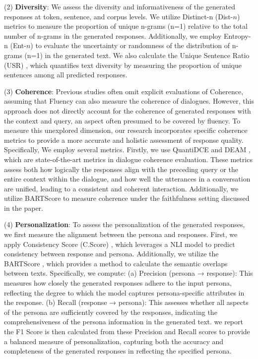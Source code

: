 \documentclass[letterpaper]{article} %
\begin{document}
(2) \textbf{Diversity}: We assess the diversity and informativeness of the generated responses at token, sentence, and corpus levels. We utilize Distinct-n (Dist-$n$) metrics \cite{li-etal-2016-diversity} to measure the proportion of unique n-grams (n=1) relative to the total number of n-grams in the generated responses. Additionally, we employ Entropy-n (Ent-$n$) \cite{zhang-etal-2018-generating} to evaluate the uncertainty or randomness of the distribution of n-grams (n=1) in the generated text. We also calculate the Unique Sentence Ratio (USR) \cite{li-etal-2020-generate}, which quantifies text diversity by measuring the proportion of unique sentences among all predicted responses.

(3) \textbf{Coherence}: Previous studies often omit explicit evaluations of Coherence, assuming that Fluency can also measure the coherence of dialogues. However, this approach does not directly account for the coherence of generated responses with the context and query, an aspect often presumed to be covered by fluency. To measure this unexplored dimension, our research incorporates specific coherence metrics to provide a more accurate and holistic assessment of response quality. Specifically, We employ several metrics. Firstly, we use QuantiDCE \cite{ye-etal-2021-towards-quantifiable} and DEAM \cite{ghazarian-etal-2022-deam}, which are state-of-the-art metrics in dialogue coherence evaluation. These metrics assess both how logically the responses align with the preceding query or the entire context within the dialogue, and how well the utterances in a conversation are unified, leading to a consistent and coherent interaction. Additionally, we utilize BARTScore \cite{yuan-etal-2021-bartscore} to measure coherence under the faithfulness setting discussed in the paper.

(4) \textbf{Personalization}: To assess the personalization of the generated responses, we first measure the alignment between the persona and responses. First, we apply Consistency Score (C.Score) \cite{madotto-etal-2019-personalizing}, which leverages a NLI model to predict consistency between response and persona. Additionally, we utilize the BARTScore \cite{yuan-etal-2021-bartscore}, which provides a method to calculate the semantic overlaps between texts. Specifically, we compute: (a) Precision (persona → response): This measures how closely the generated responses adhere to the input persona, reflecting the degree to which the model captures persona-specific attributes in the response. (b) Recall (response → persona): This assesses whether all aspects of the persona are sufficiently covered by the responses, indicating the comprehensiveness of the persona information in the generated text. we report the F1 Score is then calculated from these Precision and Recall scores to provide a balanced measure of personalization, capturing both the accuracy and completeness of the generated responses in reflecting the specified persona.
\end{document}

